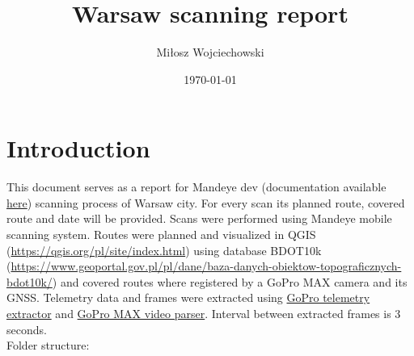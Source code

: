 \documentclass[a4paper,12pt]{article}
\title{Warsaw scanning report}
\author{Miłosz Wojciechowski}
\date{\today}
\begin{document}
\maketitle
\pagebreak
\tableofcontents
\pagebreak

\section{Introduction}
This document serves as a report for Mandeye dev (documentation available \href{link}{here}) scanning process of Warsaw city. For every scan its planned route, covered route and date will be provided. Scans were performed using Mandeye mobile scanning system. Routes were planned and visualized in QGIS (\url{https://qgis.org/pl/site/index.html}) using database BDOT10k (\url{https://www.geoportal.gov.pl/pl/dane/baza-danych-obiektow-topograficznych-bdot10k/}) and covered routes where registered by a GoPro MAX camera and its GNSS. Telemetry data and frames were extracted using
\href{https://github.com/miloszwojciechowski/Warsaw-model/tree/main/GoPro-Telemetry-Extractor}{GoPro telemetry extractor} and \href{https://github.com/miloszwojciechowski/Warsaw-model/tree/main/GoPro_MAX_video_parser}{GoPro MAX video parser}. Interval between extracted frames is 3 seconds.\\

Folder structure: 
\end{document}
